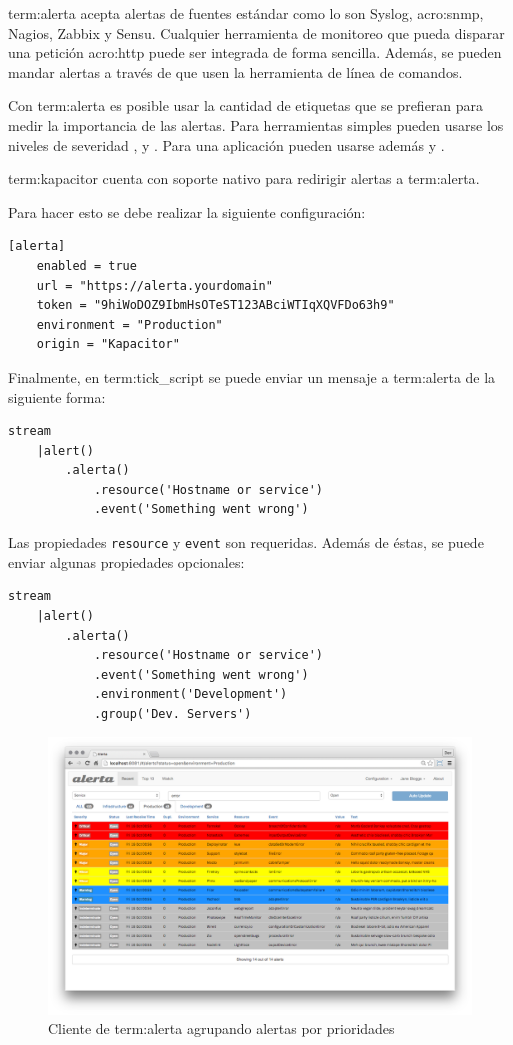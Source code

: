 \gls{term:alerta} acepta alertas de fuentes estándar como lo son Syslog,
\gls{acro:snmp}, Nagios, Zabbix y Sensu. Cualquier herramienta de monitoreo que
pueda disparar una petición \gls{acro:http} puede ser integrada de forma sencilla. Además,
se pueden mandar alertas a través de  que usen la herramienta de línea
de comandos.

Con \gls{term:alerta} es posible usar la cantidad de etiquetas que se prefieran
para medir la importancia de las alertas. Para herramientas simples pueden
usarse los niveles de severidad ,  y . Para
una aplicación pueden usarse además  y .

\gls{term:kapacitor} cuenta con soporte nativo para redirigir alertas a
\gls{term:alerta}.

Para hacer esto se debe realizar la siguiente configuración:

\begin{lstlisting}
[alerta]
    enabled = true
    url = "https://alerta.yourdomain"
    token = "9hiWoDOZ9IbmHsOTeST123ABciWTIqXQVFDo63h9"
    environment = "Production"
    origin = "Kapacitor"
\end{lstlisting}

Finalmente, en \gls{term:tick_script} se puede enviar un mensaje a
\gls{term:alerta} de la siguiente forma:

\begin{lstlisting}
stream
    |alert()
        .alerta()
            .resource('Hostname or service')
            .event('Something went wrong')
\end{lstlisting}

Las propiedades \lstinline{resource} y \lstinline{event} son requeridas. Además
de éstas, se puede enviar algunas propiedades opcionales:

\begin{lstlisting}
stream
    |alert()
        .alerta()
            .resource('Hostname or service')
            .event('Something went wrong')
            .environment('Development')
            .group('Dev. Servers')
\end{lstlisting}


\begin{figure}
  \includegraphics[width=\linewidth]{src/images/06-capitulo-6/alerta.png}
  \caption{Cliente de \gls{term:alerta} agrupando alertas por prioridades}
  \label{fig:alerta}
\end{figure}

